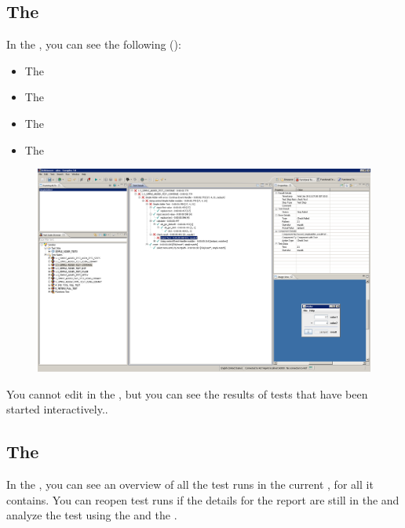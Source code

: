  \clearpage
\subsection{The \execpersp{}}

In the \execpersp{}, you can see the following ():


\begin{itemize}
\item The \gdtestsuitebrowser{}
\item The \gdtestresultview{}
\item The \gdpropview{} 
\item The \gdimgview{}
\end{itemize}


\begin{figure}
\includegraphics[width=12.5cm]{Userinterface/Editors/PS/executionclient}
\caption{\execpersp{}}
\label{executionclient}
\end{figure}

You cannot edit in the \execpersp{}, but you can see the results of tests that have been started interactively.. 
\clearpage

\subsection{The \reportpersp{}}

In the \reportpersp{}, you can see an overview of all the test runs in the current \gddb{}, for all \gdprojects{} it contains. You can reopen test runs if the details for the report are still in the \gddb{}  and analyze the test using the \gdpropview{} and the \gdimgview{}. 

